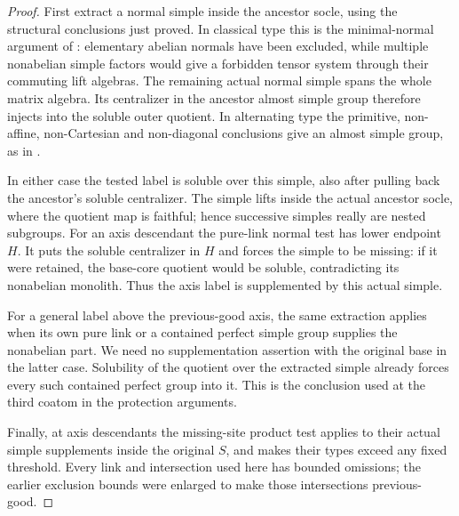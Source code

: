 \begin{proof}

First extract a normal simple inside the ancestor socle, using the
structural conclusions just proved.  In classical type this is the
minimal-normal argument of : elementary
abelian normals have been excluded, while multiple nonabelian simple
factors would give a forbidden tensor system through their commuting
lift algebras.  The remaining actual normal simple spans the whole
matrix algebra.  Its centralizer in the ancestor almost simple group
therefore injects into the soluble outer quotient.  In alternating
type the primitive, non-affine, non-Cartesian and non-diagonal
conclusions give an almost simple group, as in
.

In either case the tested label is soluble over this simple, also
after pulling back the ancestor's soluble centralizer.  The simple
lifts inside the actual ancestor socle, where the quotient map is
faithful; hence successive simples really are nested subgroups.
For an axis descendant the pure-link normal test has lower endpoint
\(H\).  It puts the soluble centralizer in \(H\) and forces the
simple to be missing: if it were retained, the base-core quotient
would be soluble, contradicting its nonabelian monolith.  Thus the
axis label is supplemented by this actual simple.

For a general label above the previous-good axis, the same extraction
applies when its own pure link or a contained perfect simple group
supplies the nonabelian part.  We need no supplementation assertion
with the original base in the latter case.  Solubility of the quotient
over the extracted simple already forces every such contained
perfect group into it.  This is the conclusion used at the third
coatom in the protection arguments.

Finally, at axis descendants the missing-site product test applies
to their actual simple supplements inside the original \(S\), and
 makes their types exceed any fixed threshold.
Every link and intersection used here has bounded omissions; the
earlier exclusion bounds were enlarged to make those intersections
previous-good.

\end{proof}

